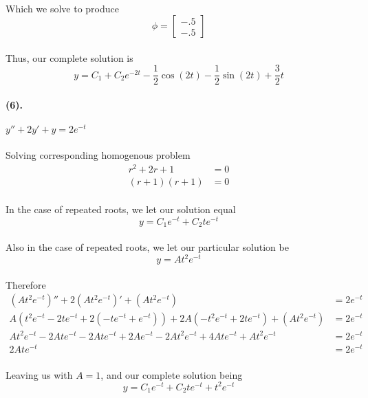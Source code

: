 \documentclass{article}
\begin{document}
\paragraph{}Which we solve to produce
\[
    \phi =
    \begin{bmatrix}
    -.5\\
    -.5
    \end{bmatrix}
\]
\paragraph{}Thus, our complete solution is
\[
    y = C_1 + C_2e^{-2t} - \frac{1}{2}\cos(2t)-\frac{1}{2}\sin(2t)+\frac{3}{2}t 
\]
\paragraph{(6).} $y''+2y'+y=2e^{-t}$
\paragraph{}Solving corresponding homogenous problem
\begin{align*}
    r^2 + 2r + 1 &= 0 \\
    (r+1)(r+1) &= 0
\end{align*}
\paragraph{}In the case of repeated roots, we let our solution equal
\[
    y = C_1e^{-t} + C_2te^{-t} 
\]
\paragraph{}Also in the case of repeated roots, we let our particular solution be
\[
    y = At^2e^{-t} 
\]
\paragraph{}Therefore
\begin{align*}
    (At^2e^{-t})'' +2(At^2e^{-t})' +(At^2e^{-t}) &= 2e^{-t}\\
    A(t^2e^{-t} -2te^{-t} + 2(-te^{-t}+e^{-t}))+2A(-t^2e^{-t} + 2te^{-t})+(At^2e^{-t}) &= 2e^{-t}\\
    At^2e^{-t}-2Ate^{-t}-2Ate^{-t}+2Ae^{-t}-2At^{2}e^{-t}+4Ate^{-t}+At^{2}e^{-t}&= 2e^{-t}\\
    2Ate^{-t} &= 2e^{-t}
\end{align*}
\paragraph{}Leaving us with $A=1$, and our complete solution being
\[
    y = C_1e^{-t}+C_2te^{-t}+t^2e^{-t} 
\]
\end{document}
